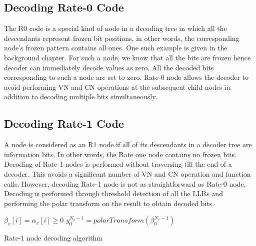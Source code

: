 \subsection{Decoding Rate-0 Code}
The R0 code is a special kind of node in a decoding tree in which all the descendants represent frozen bit positions, in other words, the corresponding node's frozen pattern contains all ones. One such example is given in the background chapter. For such a node, we know that all the bits are frozen hence decoder can immediately decode values as zero. All the decoded bits corresponding to such a node are set to zero. Rate-0 node allows the decoder to avoid performing VN and CN operations at the subsequent child nodes in addition to decoding multiple bits simultaneously.

\subsection{Decoding Rate-1 Code}
A node is considered as an R1 node if all of its descendants in a decoder tree are information bits. In other words, the Rate one node contains no frozen bits. Decoding of Rate-1 nodes is performed without traversing till the end of a decoder. This avoids a significant number of VN and CN operation and function calls. However, decoding Rate-1 node is not as straightforward as Rate-0 node. Decoding is performed through threshold detection of all the LLRs and performing the polar transform on the result to obtain decoded bits.

\IncMargin{1.5em}
\begin{algorithm}[]
	 {
		 {
			$\beta_{v}[i] = \alpha_{v}[i] \ge 0$\;
		}
		$y_{0}^{N_v-1} = polarTransform(\beta_{0}^{N_v-1})$ \;
	}
	\caption{Rate-1 node decoding algorithm}
	\label{algo:R1Decoding}
\end{algorithm}
\DecMargin{1.5em}

